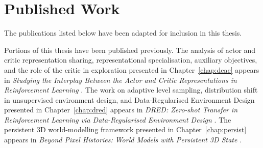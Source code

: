 \section{Published Work}
\label{sec:intro_published_work}

The publications listed below have been adapted for inclusion in this thesis.

Portions of this thesis have been published previously. The analysis of actor and critic representation sharing, representational specialisation, auxiliary objectives, and the role of the critic in exploration presented in Chapter~\ref{chap:deac} appears in \emph{Studying the Interplay Between the Actor and Critic Representations in Reinforcement Learning} \citep{garcin2025studying}. The work on adaptive level sampling, distribution shift in unsupervised environment design, and Data-Regularised Environment Design presented in Chapter~\ref{chap:dred} appears in \emph{DRED: Zero-shot Transfer in Reinforcement Learning via Data-Regularised Environment Design} \citep{garcin2024dred}. The persistent 3D world-modelling framework presented in Chapter~\ref{chap:persist} appears in \emph{Beyond Pixel Histories: World Models with Persistent 3D State} \citep{garcin2026beyond}.
